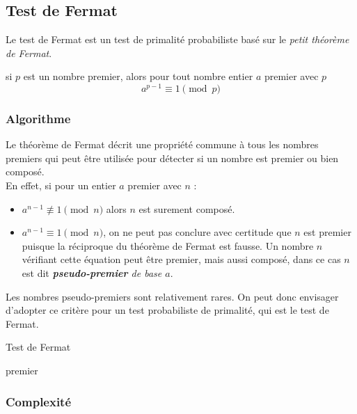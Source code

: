 		
		\subsection{Test de Fermat}
			Le test de Fermat est un test de primalité probabiliste basé sur le \textit{petit théorème de Fermat}.
			
			\vspace{-1.5em}\begin{adjustwidth}{1.5cm}{1.5cm} 
			\begin{Th}
				si $p$ est un nombre premier, alors pour tout nombre entier $a$ premier avec $p$
				\[a^{p-1}\equiv 1 \pmod p\]
			\end{Th}
			\end{adjustwidth}\vspace{0.5em}
			
			\subsubsection{Algorithme}
				Le théorème de Fermat décrit une propriété commune à tous les nombres premiers qui peut être utilisée pour détecter si un nombre est premier ou bien composé.\\
				En effet, si pour un entier $a$ premier avec $n$ : 
				\begin{itemize}
				\item $a^{n-1} \not\equiv 1 \pmod n$ alors $n$ est surement composé.
				\item $a^{n-1}\equiv 1 \pmod n$, on ne peut pas conclure avec certitude que $n$ est premier puisque la réciproque du théorème de Fermat est fausse. Un nombre $n$ vérifiant cette équation peut être premier, mais aussi composé, dans ce cas $n$ est dit \textit{\textbf{pseudo-premier} de base $a$}.
				\end{itemize}
				Les nombres pseudo-premiers sont relativement rares. On peut donc envisager d'adopter ce critère pour un test probabiliste de primalité, qui est le test de Fermat.
				
				\begin{algorithm}
					\caption{Test de Fermat}\label{TF}
				\Retour premier\;
				\end{algorithm}
		
			\subsubsection{Complexité}
